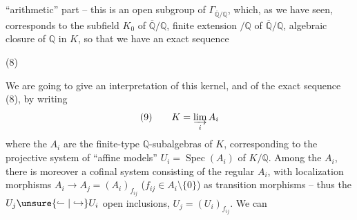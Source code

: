 ``arithmetic'' part -- this is an open subgroup of $\Gamma_{\overline{\mathbb Q}/\mathbb Q}$, which, as we have seen, corresponds to the subfield $K_0$ of $\overline{\mathbb Q}/\mathbb Q$,  finite extension $/\mathbb Q$ of $\overline{\mathbb Q}/\mathbb Q$, algebraic closure of $\mathbb Q$ in $K$, so that we have an exact sequence

\noindent (8)\quad{}

We are going to give an interpretation of this kernel, and of the exact sequence (8), by writing
\[
(9)\qquad K=\varinjlim_i A_i
\]
where the $A_i$ are the finite-type $\mathbb Q$-subalgebras of $K$, corresponding to the projective system of ``affine models'' $U_i=\operatorname{Spec}(A_i)$ of $K/\mathbb Q$. Among the $A_i$, there is moreover a cofinal system consisting of the regular $A_i$,  with localization morphisms $A_i\longrightarrow A_j=(A_i)_{f_{ij}}$ ($f_{ij}\in A_i\setminus\{0\}$) as transition morphisms -- thus the $U_j\unsure{\lhook\joinrel\relbar|\hookrightarrow}U_i$ open inclusions, $U_j=(U_i)_{f_{ij}}$. We can
